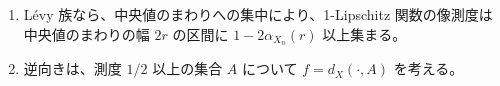 \begin{enumerate}
\item Lévy 族なら、中央値のまわりへの集中により、1-Lipschitz 関数の像測度は
  中央値のまわりの幅 $2r$ の区間に $1 - 2\alpha_{X_n}(r)$ 以上集まる。
\item 逆向きは、測度 $1/2$ 以上の集合 $A$ について $f = d_X(\cdot, A)$ を考える。
\end{enumerate}
